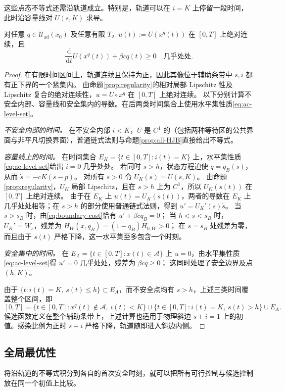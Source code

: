 \documentclass[lang=cn,a4paper,newtx]{elegantpaper}
\theoremstyle{plain}
\theoremstyle{definition}
\newcommand{\Acal}{\mathcal A}
\newcommand{\Uad}{\mathcal U_{\mathrm{ad}}}
\newcommand{\dd}{\,\mathrm d}
\begin{document}
这些点态不等式还需沿轨道成立。特别是，轨道可以在 $i=K$ 上停留一段时间，此时沿容量线对 $U(s,K)$ 求导。

\begin{lemma}[沿任意可行轨道的验证不等式]
\label{lem:trajectory-verification}
对任意 $q\in\Uad(x_0)$ 及任意有限 $T$，$u(t):=U(x^q(t))$ 在 $[0,T]$ 上绝对连续，且
\begin{equation}
\frac{\dd}{\dd t}U(x^q(t))+\beta cq(t)\ge0\quad\text{几乎处处}.
\label{eq:verification-ineq}
\end{equation}
\end{lemma}
\begin{proof}
在有限时间区间上，轨道连续且保持为正，因此其像位于辅助条带中 $s,i$ 都有正下界的一个紧集内。
由命题\ref{prop:regularity}的相对局部 Lipschitz 性及 Lipschitz 复合的绝对连续性，$u=U\circ x^q$ 在 $[0,T]$ 上绝对连续。
以下分别计算不安全内部、容量线和安全集内的导数。在后两类时间集合上使用水平集性质\eqref{eq:ac-level-set}。

\emph{不安全内部的时间。}
在不安全内部 $i<K$，$U$ 是 $C^1$ 的（包括两种等待区的公共界面与非平凡切换界面），普通链式法则与命题\ref{prop:all-HJB}直接给出不等式。

\emph{容量线上的时间。}
在时间集合 $E_K=\{t\in[0,T]:i(t)=K\}$ 上，水平集性质\eqref{eq:ac-level-set}给出 $\dot i=0$ 几乎处处。
若同时 $s>h$，状态方程迫使 $q=q_B(s)$，从而 $\dot s=-cK(s-p)$。
对所有 $s>0$ 令 $U_K(s)=U(s,K)$。
由命题\ref{prop:regularity}，$U_K$ 局部 Lipschitz，且在 $s>h$ 上为 $C^1$，所以 $U_K(s(t))$ 在 $[0,T]$ 上绝对连续。
由于在 $E_K$ 上 $u(t)=U_K(s(t))$，两者的导数在 $E_K$ 上几乎处处相等；在 $s>h$ 的部分使用普通链式法则，得到 $u'=U_K'(s)\dot s$。
当 $s>s_B$ 时，由\eqref{eq:boundary-cost}恰有 $u'+\beta cq_B=0$；
当 $h<s<s_B$ 时，$U_K'=W_s$，残差为 $H_W(x,q_B)=(1-q_B)H_{0,W}>0$；
在 $s=s_B$ 处残差为零，而且由于 $s(t)$ 严格下降，这一水平集至多包含一个时刻。

\emph{安全集中的时间。}
在 $E_A=\{t\in[0,T]:x(t)\in\Acal\}$ 上 $u=0$，由水平集性质\eqref{eq:ac-level-set}得 $u'=0$ 几乎处处，残差为 $\beta cq\ge0$；
这同时处理了安全边界及点 $(h,K)$。

由于 $\{t:i(t)=K,\ s(t)\le h\}\subset E_A$，而不安全点均有 $s>h$，上述三类时间覆盖整个区间，即
\[
[0,T]
=\{t\in[0,T]:x^q(t)\notin\Acal,\ i(t)<K\}
\cup\{t\in[0,T]:i(t)=K,\ s(t)>h\}
\cup E_A.
\]
候选函数定义在整个辅助条带上，上述计算也适用于物理斜边 $s+i=1$ 上的初值。感染比例为正时 $s+i$ 严格下降，轨道随即进入斜边内侧。
\end{proof}

\subsection{全局最优性}
\label{sec:global-verification}
将沿轨道的不等式积分到各自的首次安全时刻，就可以把所有可行控制与候选控制放在同一个初值上比较。
\end{document}
